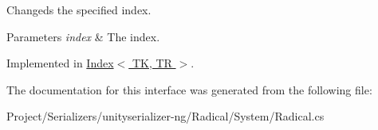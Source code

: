 Changeds the specified index. 


\begin{DoxyParams}{Parameters}
{\em index} & The index.\\
\hline
\end{DoxyParams}


Implemented in \hyperlink{class_index_a3e67374081c64d8097112ab9286bbf1b}{Index$<$ T\+K, T\+R $>$}.



The documentation for this interface was generated from the following file\+:\begin{DoxyCompactItemize}
\item 
Project/\+Serializers/unityserializer-\/ng/\+Radical/\+System/Radical.\+cs\end{DoxyCompactItemize}
